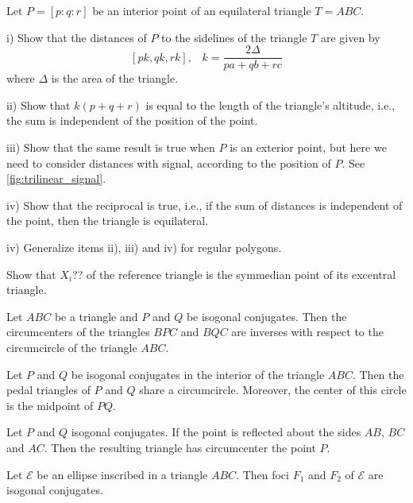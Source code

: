 \begin{exercise}\label{ex:1chap1}
Let $P=[p:q:r] $ be an interior point of an equilateral triangle $T=ABC$.

\noindent i) Show that the distances of $P$ to the sidelines of the triangle $T$ are given by
\[ [pk,qk,rk], \;\;\;k=\frac{2\Delta}{pa+qb+rc}\]
where $\Delta$ is the area of the triangle.

 \noindent ii)
 Show that  $k(p+q+r)$ is equal to the length of the triangle's altitude, i.e., the sum is independent of the position of the point.
 
 \noindent iii) Show that the same result is true when $P$ is an exterior point, but here we need to consider distances with signal, according to the position of $P$. See \cref{fig:trilinear_signal}.
 
 \noindent iv) Show that the reciprocal is true, i.e., if the sum of distances is independent of the point, then the triangle is equilateral.
 
 \noindent iv) Generalize items ii), iii) and iv)  for regular polygons.
 \end{exercise}
 
 \begin{exercise}\label{ex:2chap1} Show that $X_i$??  of the reference triangle    is the symmedian point of its excentral triangle.
 
  \end{exercise}
 
  \begin{exercise}\label{ex:3appA}
 Let $ABC$ be a  triangle and    $P$ and $Q$ be isogonal conjugates.  Then the circumcenters of the triangles $BPC$ and $BQC$ are inverses with respect to the circumcircle of the triangle $ABC$.
   \end{exercise}
  
   \begin{exercise}\label{ex:4appA}
   Let $P$ and $Q$ be isogonal conjugates in the interior of
the triangle $ABC$. Then the   pedal  triangles of $P$ and $Q$
 share a circumcircle. Moreover, the center of this circle is the midpoint
of $PQ$.
    \end{exercise}
   
      \begin{exercise}\label{ex:5app}
  Let $P $ and $Q$ isogonal conjugates.  If the point
is reflected about the sides
$AB$, $BC$ and $AC$.
  Then the resulting triangle has circumcenter the point $P$.
 
    \end{exercise}  \begin{exercise}\label{ex:6app}
  Let $\mathcal{E}$ be an ellipse inscribed in a triangle $ABC$. Then foci $F_1$ and $F_2$ of $\mathcal{E}$ are isogonal conjugates. 
 
    \end{exercise}
    
